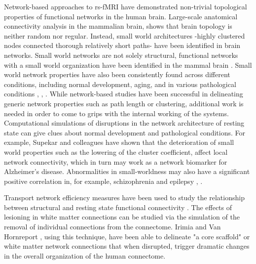 \documentclass[12pt,a4paper]{article}
\begin{document}
Network-based approaches to rs-fMRI have demonstrated
non-trivial topological properties of functional networks in the human brain.
Large-scale anatomical
connectivity analysis in the mammalian brain, shows that brain topology is
neither random nor regular. Instead, small world
architectures \cite{Watts:1998} -highly clustered nodes connected thorough
relatively short paths- have been identified in brain networks. 
Small world networks are not solely
structural, functional networks with a small world organization have been
identified in the mammal brain \cite{Bassett:2006}. Small world network properties have also been consistently found across different
conditions, including normal development, aging, and
in various pathological conditions \cite{wang_graph-based_2010}, \cite{anderson_decreased_2013}, \cite{stam_modern_2014}. 
While network-based studies have been successful in delineating generic network properties such as
path length or clustering, additional work is needed in order to come to grips
with the internal working of the systems.
Computational simulations of disruptions in the network
architecture of resting state can give clues about
normal development and pathological conditions. For example, Supekar and
colleagues \cite{Supekar:2008} have shown that the deterioration of small world
properties such as the lowering of the cluster coefficient, affect local
network connectivity, which in turn may work as a network biomarker for
Alzheimer's disease. Abnormalities in small-worldness may also have a
significant positive correlation in, for example, schizophrenia
\cite{liu_disrupted_2008} and epilepsy \cite{liao_altered_2010}, \cite{zhang_altered_2011}.

Transport network efficiency measures have been used to study the relationship between structural and resting state functional connectivity \cite{goni_resting-brain_2014}. 
The effects of lesioning in white matter connections can be studied via the simulation of the removal of individual connections from the connectome. Irimia and Van Hornreport \cite{irimia_systematic_2014}, using this technique, have been able to delineate "a core scaffold" or white matter network connections that when disrupted, trigger dramatic changes in the overall organization of the human connectome.   
\end{document}

